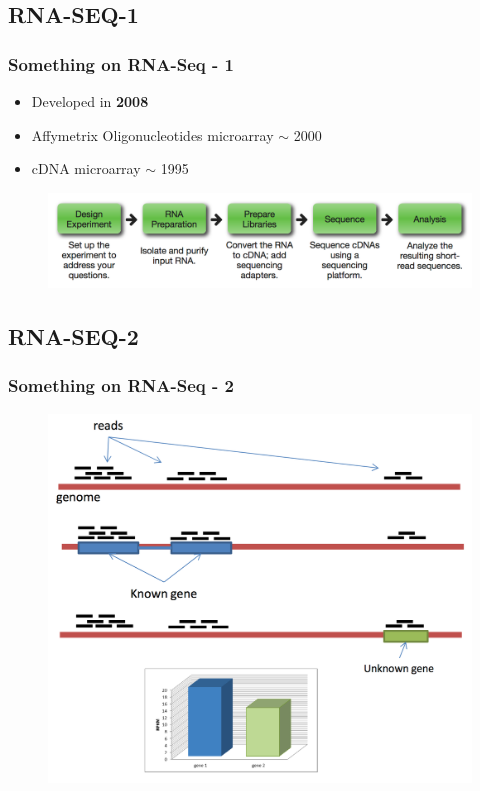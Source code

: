 \documentclass[professionalfont]{beamer}
\begin{document}
  \subsection{RNA-SEQ-1}
  \begin{frame}
    \frametitle{Something on RNA-Seq - 1}
      \begin{itemize}
        \item Developed in \textbf{2008}
        \item Affymetrix Oligonucleotides microarray $\sim$ 2000
        \item cDNA microarray $\sim$ 1995
      \end{itemize}
      \begin{figure}
        \includegraphics[scale=0.45]{figures/rnaseq.png}
      \end{figure}
  \end{frame}

  \subsection{RNA-SEQ-2}
  \begin{frame}
    \frametitle{Something on RNA-Seq - 2}
      \begin{figure}
        \includegraphics[scale=0.3]{figures/rnaseq2.png}
      \end{figure}
  \end{frame}
\end{document}

